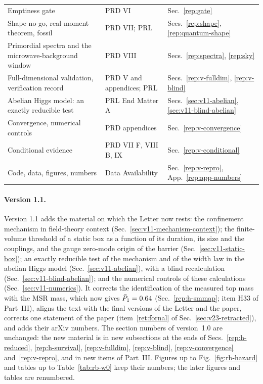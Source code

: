 \begin{table}[ht]
\begin{tabular}{@{}p{}p{}p{}@{}}
Emptiness gate & PRD VI & Sec.~\ref{rep:gate} \\
Shape no-go, real-moment theorem, fossil & PRD VII; PRL & Secs.~\ref{rep:shape}, \ref{rep:quantum-shape} \\
Primordial spectra and the microwave-background window & PRD VIII & Secs.~\ref{rep:spectra}, \ref{rep:sky} \\
Full-dimensional validation, verification record & PRD V and appendices; PRL & Secs.~\ref{rep:v-fulldim}, \ref{rep:v-blind} \\
Abelian Higgs model: an exactly reducible test & PRL End Matter A & Secs.~\ref{sec:v11-abelian}, \ref{sec:v11-blind-abelian} \\
Convergence, numerical controls & PRD appendices & Sec.~\ref{rep:v-convergence} \\
Conditional evidence & PRD VII F, VIII B, IX & Sec.~\ref{rep:v-conditional} \\
Code, data, figures, numbers & Data Availability & Sec.~\ref{rep:v-repro}, App.~\ref{rep:app-numbers} \\
\bottomrule
\end{tabular}
\end{table}

\paragraph{Version 1.1.}
Version 1.1 adds the material on which the Letter now rests: the confinement mechanism in field-theory context (Sec.~\ref{sec:v11-mechanism-context}); the finite-volume threshold of a static box as a function of its duration, its size and the couplings, and the gauge zero-mode origin of the barrier (Sec.~\ref{sec:v11-static-box}); an exactly reducible test of the mechanism and of the width law in the abelian Higgs model (Sec.~\ref{sec:v11-abelian}), with a blind recalculation (Sec.~\ref{sec:v11-blind-abelian}); and the numerical controls of these calculations (Sec.~\ref{sec:v11-numerics}).
It corrects the identification of the measured top mass with the MSR mass, which now gives $\bar P_1=0.64$ (Sec.~\ref{rep:h-smmap}; item H33 of Part~III), aligns the text with the final versions of the Letter and the paper, corrects one statement of the paper (item~\ref{ret:fornal} of Sec.~\ref{sec:v23-retracted}), and adds their arXiv numbers.
The section numbers of version~1.0 are unchanged: the new material is in new subsections at the ends of Secs.~\ref{rep:h-reduced}, \ref{rep:h-survival}, \ref{rep:v-fulldim}, \ref{rep:v-blind}, \ref{rep:v-convergence} and~\ref{rep:v-repro}, and in new items of Part~III.
Figures up to Fig.~\ref{fig:rb-hazard} and tables up to Table~\ref{tab:rb-w0} keep their numbers; the later figures and tables are renumbered.

